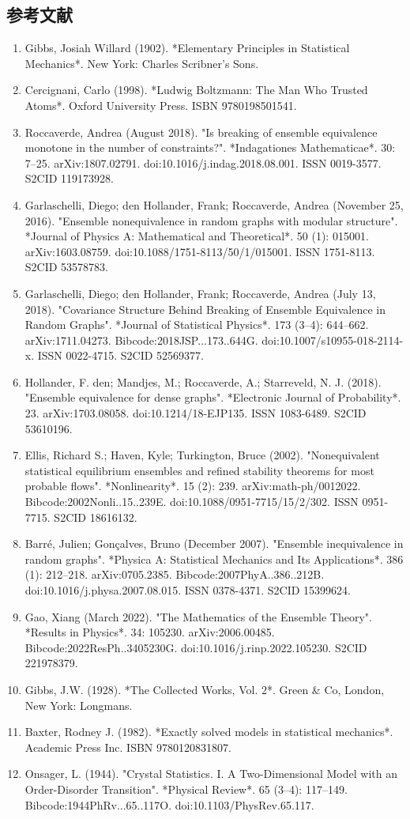 \subsection{参考文献} 
\begin{enumerate}
\item Gibbs, Josiah Willard (1902). *Elementary Principles in Statistical Mechanics*. New York: Charles Scribner's Sons.  
\item Cercignani, Carlo (1998). *Ludwig Boltzmann: The Man Who Trusted Atoms*. Oxford University Press. ISBN 9780198501541.  
\item Roccaverde, Andrea (August 2018). "Is breaking of ensemble equivalence monotone in the number of constraints?". *Indagationes Mathematicae*. 30: 7–25. arXiv:1807.02791. doi:10.1016/j.indag.2018.08.001. ISSN 0019-3577. S2CID 119173928.  
\item Garlaschelli, Diego; den Hollander, Frank; Roccaverde, Andrea (November 25, 2016). "Ensemble nonequivalence in random graphs with modular structure". *Journal of Physics A: Mathematical and Theoretical*. 50 (1): 015001. arXiv:1603.08759. doi:10.1088/1751-8113/50/1/015001. ISSN 1751-8113. S2CID 53578783.  
\item Garlaschelli, Diego; den Hollander, Frank; Roccaverde, Andrea (July 13, 2018). "Covariance Structure Behind Breaking of Ensemble Equivalence in Random Graphs". *Journal of Statistical Physics*. 173 (3–4): 644–662. arXiv:1711.04273. Bibcode:2018JSP...173..644G. doi:10.1007/s10955-018-2114-x. ISSN 0022-4715. S2CID 52569377.  
\item Hollander, F. den; Mandjes, M.; Roccaverde, A.; Starreveld, N. J. (2018). "Ensemble equivalence for dense graphs". *Electronic Journal of Probability*. 23. arXiv:1703.08058. doi:10.1214/18-EJP135. ISSN 1083-6489. S2CID 53610196.
\item Ellis, Richard S.; Haven, Kyle; Turkington, Bruce (2002). "Nonequivalent statistical equilibrium ensembles and refined stability theorems for most probable flows". *Nonlinearity*. 15 (2): 239. arXiv:math-ph/0012022. Bibcode:2002Nonli..15..239E. doi:10.1088/0951-7715/15/2/302. ISSN 0951-7715. S2CID 18616132.  
\item Barré, Julien; Gonçalves, Bruno (December 2007). "Ensemble inequivalence in random graphs". *Physica A: Statistical Mechanics and Its Applications*. 386 (1): 212–218. arXiv:0705.2385. Bibcode:2007PhyA..386..212B. doi:10.1016/j.physa.2007.08.015. ISSN 0378-4371. S2CID 15399624.  
\item Gao, Xiang (March 2022). "The Mathematics of the Ensemble Theory". *Results in Physics*. 34: 105230. arXiv:2006.00485. Bibcode:2022ResPh..3405230G. doi:10.1016/j.rinp.2022.105230. S2CID 221978379.  
\item Gibbs, J.W. (1928). *The Collected Works, Vol. 2*. Green & Co, London, New York: Longmans.  
\item Baxter, Rodney J. (1982). *Exactly solved models in statistical mechanics*. Academic Press Inc. ISBN 9780120831807.  
\item Onsager, L. (1944). "Crystal Statistics. I. A Two-Dimensional Model with an Order-Disorder Transition". *Physical Review*. 65 (3–4): 117–149. Bibcode:1944PhRv...65..117O. doi:10.1103/PhysRev.65.117.
\end{enumerate}